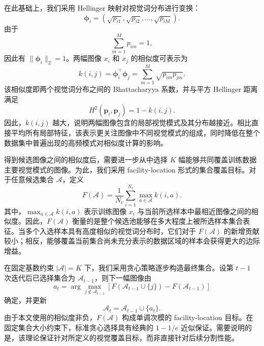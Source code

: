 \documentclass[UTF8,a4paper,10pt]{ctexart}
\begin{document}
在此基础上，我们采用 Hellinger 映射对视觉词分布进行变换：
\begin{equation}
\boldsymbol{\phi}_i
=
\left(
\sqrt{p_{i1}},
\sqrt{p_{i2}},
\ldots,
\sqrt{p_{iM}}
\right).
\end{equation}
由于
\begin{equation}
\sum_{m=1}^{M}p_{im}=1,
\end{equation}
因此有 $\|\boldsymbol{\phi}_i\|_2=1$。两幅图像 $x_i$ 和 $x_j$ 的相似度可表示为
\begin{equation}
k(i,j)
=
\boldsymbol{\phi}_i^{\top}\boldsymbol{\phi}_j
=
\sum_{m=1}^{M}
\sqrt{p_{im}p_{jm}}.
\end{equation}
该相似度即两个视觉词分布之间的 Bhattacharyya 系数，并与平方 Hellinger 距离满足
\begin{equation}
H^2(\mathbf{p}_i,\mathbf{p}_j)
=
1-k(i,j).
\end{equation}
因此，$k(i,j)$ 越大，说明两幅图像包含的局部视觉模式及其分布越接近。相比直接平均所有局部特征，该表示更关注图像中不同视觉模式的组成，同时降低在整个数据集中普遍出现的高频模式对相似度计算的影响。

得到候选图像之间的相似度后，需要进一步从中选择 $K$ 幅能够共同覆盖训练数据主要视觉模式的图像。为此，我们采用 facility-location 形式的集合覆盖目标。对于任意候选集合 $\mathcal{A}$，定义
\begin{equation}
F(\mathcal{A})
=
\frac{1}{N_c}
\sum_{i=1}^{N_c}
\max_{a\in\mathcal{A}}k(i,a).
\end{equation}
其中，$\max_{a\in\mathcal{A}}k(i,a)$ 表示训练图像 $x_i$ 与当前所选样本中最相近图像之间的相似度。因此，$F(\mathcal{A})$ 衡量的是整个候选池能够在多大程度上被所选样本集合表征。当多个入选样本具有高度相似的视觉词分布时，它们对于 $F(\mathcal{A})$ 的新增贡献较小；相反，能够覆盖当前集合尚未充分表示的数据区域的样本会获得更大的边际增益。

在固定基数约束 $|\mathcal{A}|=K$ 下，我们采用贪心策略逐步构造最终集合。设第 $t-1$ 次迭代后已选择集合为 $\mathcal{A}_{t-1}$，则下一幅图像由
\begin{equation}
a_t
=
\arg\max_{j\notin\mathcal{A}_{t-1}}
\left[
F\left(\mathcal{A}_{t-1}\cup\{j\}\right)
-
F\left(\mathcal{A}_{t-1}\right)
\right]
\end{equation}
确定，并更新
\begin{equation}
\mathcal{A}_t
=
\mathcal{A}_{t-1}\cup\{a_t\}.
\end{equation}
由于本文使用的相似度非负，$F(\mathcal{A})$ 构成单调次模的 facility-location 目标。在固定集合大小约束下，标准贪心选择具有经典的 $1-1/e$ 近似保证。需要说明的是，该理论保证针对所定义的视觉覆盖目标，而非直接针对后续分割性能。
\end{document}

